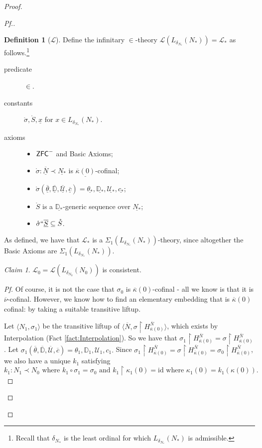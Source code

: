 \documentclass{amsart}
\theoremstyle{definition}
\newtheorem{definition}[theorem]{Definition}
\theoremstyle{remark}
\newtheorem{claimno}{Claim}
\newcommand{\D}{\mathbb{D}}
\newcommand{\N}{{\overline{N}}}
\newcommand{\U}{\mathcal{U}}
\newcommand{\ZFC}{\textup{\ensuremath{\textsf{ZFC}}}}
\newcommand{\rest}{\mathbin{\upharpoonright}}
\begin{document}
\begin{proof}
\begin{proof}[Pf.]
\begin{definition}[$\mathcal L$]
Define the infinitary $\in$-theory $\mathcal L(L_{\delta_{N_*}}(N_*))=\mathcal L_*$ as follows.\footnote{Recall that $\delta_{N_*}$ is the least ordinal for which $L_{\delta_{N_*}}(N_*)$ is admissible.}
 
\begin{description}
	\item[predicate] $\in$.
	\item[constants] $\mathring{\sigma}, \mathring S, \underline x$ for $x \in L_{\delta_{N_*}}(N_*)$. 
	\item[axioms] \begin{itemize} \item $\ZFC^-$ and \textsf{Basic Axioms};
		\item $\mathring \sigma : \underline \N \prec \underline{N_*}$ is $\underline{\overline \kappa(0)}$-cofinal;
		\item $\mathring{\sigma}(\overline{\underline{\theta}}, \overline{\underline{\D}}, \overline{\underline{\U}}, \overline{\underline c})=\underline{\theta_*}, \underline{\D_*}, \underline{\U_*}, \underline{c_*}$;
		\item $\mathring S$ is a $\underline{\D_*}$-generic sequence over $\underline{N_*}$;
		\item $\mathring \sigma ``\overline{\underline S} \subseteq \mathring S$.
	\end{itemize}
\end{description} 
\end{definition}

As defined, we have that $\mathcal L_*$ is a $\Sigma_1(L_{\delta_{N_*}}(N_*))$-theory, since altogether the \textsf{Basic Axioms} are $\Sigma_1(L_{\delta_{N_*}}(N_*))$.

\begin{claimno} \label{claim:ConL0} $\mathcal L_0=\mathcal L(L_{\delta_{N_0}}(N_0))$ is consistent. \end{claimno}
\begin{proof}[Pf] Of course, it is not the case that $\sigma_0$ is $\overline \kappa(0)$-cofinal - all we know is that it is $\overline \nu$-cofinal. However, we know how to find an elementary embedding that is $\overline \kappa(0)$ cofinal: by taking a suitable transitive liftup.

Let $\langle N_1, \sigma_1 \rangle$ be the transitive liftup of $\langle \N, \sigma \rest H^{\N}_{\overline \kappa(0)} \rangle$, which exists by Interpolation (Fact \ref{fact:Interpolation}). So we have that $\sigma_1 \rest H^\N_{\overline \kappa(0)} = \sigma \rest H^\N_{\overline \kappa(0)}$. Let $\sigma_1(\overline \theta, \overline{\D}, \overline{\U}, \overline c) = \theta_1, \D_1, \U_1, c_1.$ 
Since $\sigma_1 \rest H^\N_{\overline \kappa(0)} = \sigma \rest H^\N_{\overline \kappa(0)} = \sigma_0 \rest H^\N_{\overline \kappa(0)}$, we also have a unique $k_1$ satisfying $ \text{$k_1: N_1 \prec N_0$ where $k_1\circ \sigma_1 = \sigma_0$ and $k_1 \rest \kappa_1(0) = \text{id}$ where $\kappa_1(0)=k_1(\kappa(0))$.}$ 


\end{proof}
\end{proof}
\end{proof}
\end{document}
